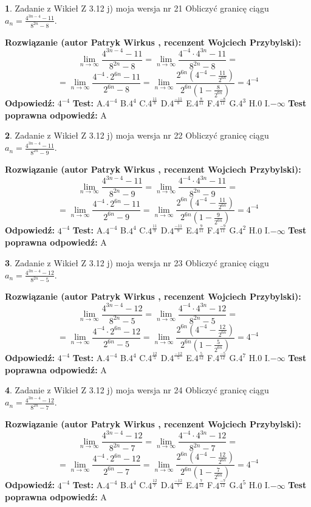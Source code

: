 \documentclass[12pt, a4paper]{article}
\theoremstyle{definition} %
\newtheorem{zad}{}
\newcommand{\zadStart}[1]{\begin{zad}#1\newline}
\newcommand{\zadStop}{\end{zad}}
\newcommand{\rozwStart}[2]{\noindent \textbf{Rozwiązanie (autor #1 , recenzent #2): }\newline}
\newcommand{\rozwStop}{\newline}
\newcommand{\odpStart}{\noindent \textbf{Odpowiedź:}\newline}
\newcommand{\odpStop}{\newline}
\newcommand{\testStart}{\noindent \textbf{Test:}\newline}
\newcommand{\testStop}{\newline}
\newcommand{\kluczStart}{\noindent \textbf{Test poprawna odpowiedź:}\newline}
\newcommand{\kluczStop}{\newline}
\begin{document}
\zadStart{Zadanie z Wikieł Z 3.12 j) moja wersja nr 21}
Obliczyć granicę ciągu $a_{n}=\frac{4^{3n-4}-11}{8^{2n}-8}$.
\zadStop
\rozwStart{Patryk Wirkus}{Wojciech Przybylski}
$$\lim\limits_{n\to\infty}\frac{4^{3n-4}-11}{8^{2n}-8}= \lim\limits_{n\to\infty}\frac{4^{-4} \cdot 4^{3n}-11}{8^{2n}-8}=$$
$$= \lim\limits_{n\to\infty}\frac{4^{-4} \cdot 2^{6n}-11}{2^{6n}-8}= \lim\limits_{n\to\infty}\frac{2^{6n}(4^{-4} - \frac{11}{2^{6n}})}{2^{6n}(1-\frac{8}{2^{6n}})}= 4^{-4}$$
\rozwStop
\odpStart
$4^{-4}$
\odpStop
\testStart
A.$4^{-4}$
B.$4^{4}$
C.$4^{\frac{11}{8}}$
D.$4^{\frac{-11}{8}}$
E.$4^{\frac{8}{11}}$
F.$4^{\frac{-8}{11}}$
G.$4^{3}$
H.$0$
I.$-\infty$
\testStop
\kluczStart
A
\kluczStop



\zadStart{Zadanie z Wikieł Z 3.12 j) moja wersja nr 22}
Obliczyć granicę ciągu $a_{n}=\frac{4^{3n-4}-11}{8^{2n}-9}$.
\zadStop
\rozwStart{Patryk Wirkus}{Wojciech Przybylski}
$$\lim\limits_{n\to\infty}\frac{4^{3n-4}-11}{8^{2n}-9}= \lim\limits_{n\to\infty}\frac{4^{-4} \cdot 4^{3n}-11}{8^{2n}-9}=$$
$$= \lim\limits_{n\to\infty}\frac{4^{-4} \cdot 2^{6n}-11}{2^{6n}-9}= \lim\limits_{n\to\infty}\frac{2^{6n}(4^{-4} - \frac{11}{2^{6n}})}{2^{6n}(1-\frac{9}{2^{6n}})}= 4^{-4}$$
\rozwStop
\odpStart
$4^{-4}$
\odpStop
\testStart
A.$4^{-4}$
B.$4^{4}$
C.$4^{\frac{11}{9}}$
D.$4^{\frac{-11}{9}}$
E.$4^{\frac{9}{11}}$
F.$4^{\frac{-9}{11}}$
G.$4^{2}$
H.$0$
I.$-\infty$
\testStop
\kluczStart
A
\kluczStop



\zadStart{Zadanie z Wikieł Z 3.12 j) moja wersja nr 23}
Obliczyć granicę ciągu $a_{n}=\frac{4^{3n-4}-12}{8^{2n}-5}$.
\zadStop
\rozwStart{Patryk Wirkus}{Wojciech Przybylski}
$$\lim\limits_{n\to\infty}\frac{4^{3n-4}-12}{8^{2n}-5}= \lim\limits_{n\to\infty}\frac{4^{-4} \cdot 4^{3n}-12}{8^{2n}-5}=$$
$$= \lim\limits_{n\to\infty}\frac{4^{-4} \cdot 2^{6n}-12}{2^{6n}-5}= \lim\limits_{n\to\infty}\frac{2^{6n}(4^{-4} - \frac{12}{2^{6n}})}{2^{6n}(1-\frac{5}{2^{6n}})}= 4^{-4}$$
\rozwStop
\odpStart
$4^{-4}$
\odpStop
\testStart
A.$4^{-4}$
B.$4^{4}$
C.$4^{\frac{12}{5}}$
D.$4^{\frac{-12}{5}}$
E.$4^{\frac{5}{12}}$
F.$4^{\frac{-5}{12}}$
G.$4^{7}$
H.$0$
I.$-\infty$
\testStop
\kluczStart
A
\kluczStop



\zadStart{Zadanie z Wikieł Z 3.12 j) moja wersja nr 24}
Obliczyć granicę ciągu $a_{n}=\frac{4^{3n-4}-12}{8^{2n}-7}$.
\zadStop
\rozwStart{Patryk Wirkus}{Wojciech Przybylski}
$$\lim\limits_{n\to\infty}\frac{4^{3n-4}-12}{8^{2n}-7}= \lim\limits_{n\to\infty}\frac{4^{-4} \cdot 4^{3n}-12}{8^{2n}-7}=$$
$$= \lim\limits_{n\to\infty}\frac{4^{-4} \cdot 2^{6n}-12}{2^{6n}-7}= \lim\limits_{n\to\infty}\frac{2^{6n}(4^{-4} - \frac{12}{2^{6n}})}{2^{6n}(1-\frac{7}{2^{6n}})}= 4^{-4}$$
\rozwStop
\odpStart
$4^{-4}$
\odpStop
\testStart
A.$4^{-4}$
B.$4^{4}$
C.$4^{\frac{12}{7}}$
D.$4^{\frac{-12}{7}}$
E.$4^{\frac{7}{12}}$
F.$4^{\frac{-7}{12}}$
G.$4^{5}$
H.$0$
I.$-\infty$
\testStop
\kluczStart
A
\kluczStop
\end{document}
